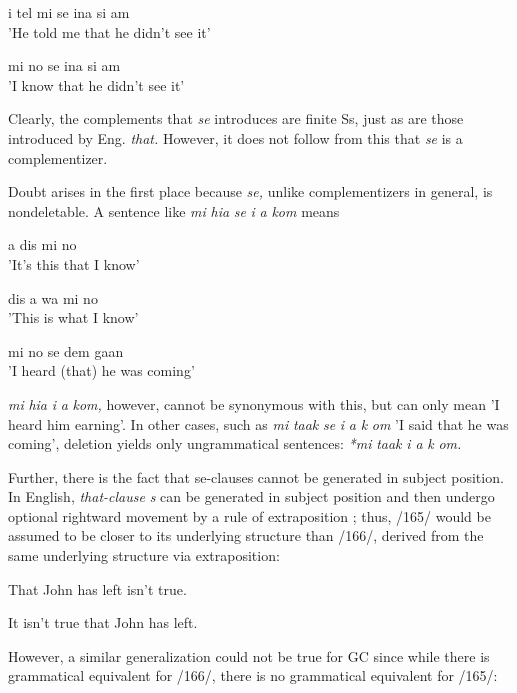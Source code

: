\ea\label{ex:163}
 i tel mi se ina si am\\
\glt 'He told me that he didn't see it'
\z



\ea\label{ex:164}
 mi no se ina si am\\
\glt 'I know that he didn't see it'
\z




Clearly, the complements that \textit{se} introduces are finite Ss, just as are those introduced by Eng. \textit{that.} However, it does not follow from this that \textit{se} is a complementizer.

Doubt arises in the first place because \textit{se,} unlike complementizers in general, is nondeletable. A sentence like \textit{mi} \textit{hia} \textit{se} \textit{i} \textit{a} \textit{kom} means

\ea\label{ex:170}
 a dis mi no \\
\glt 'It's this that I know'
\z



\ea\label{ex:171}
 dis a wa mi no\\
\glt 'This is what I know'
\z



\ea\label{ex:172}
 mi no se dem gaan\\
\glt 'I heard (that) he was coming'
\z

\textit{mi} \textit{hia} \textit{i} \textit{a} \textit{k}\textit{om,} however, cannot be synonymous with this, but can only mean 'I heard him earning'. In other cases, such as \textit{mi} \textit{taak} \textit{se} \textit{i} \textit{a} \textit{k} \textit{om} 'I said that he was coming', deletion yields only ungrammatical sentences: \textit{*mi} \textit{taak} \textit{i a} \textit{k} \textit{om.}

Further, there is the fact that se-clauses cannot be generated in subject position. In English, \textit{that-clause} \textit{s} can be generated in subject position and then undergo optional rightward movement by a rule of extraposition ; thus, /165/ would be assumed to be closer to its underlying structure than /166/, derived from the same underlying structure via extraposition:

\ea\label{ex:165}
 That John has left isn't true.
\z

\ea\label{ex:166}
 It isn't true that John has left.
\z

However, a similar generalization could not be true for GC since while there is grammatical equivalent for /166/, there is no grammatical equivalent for /165/:

